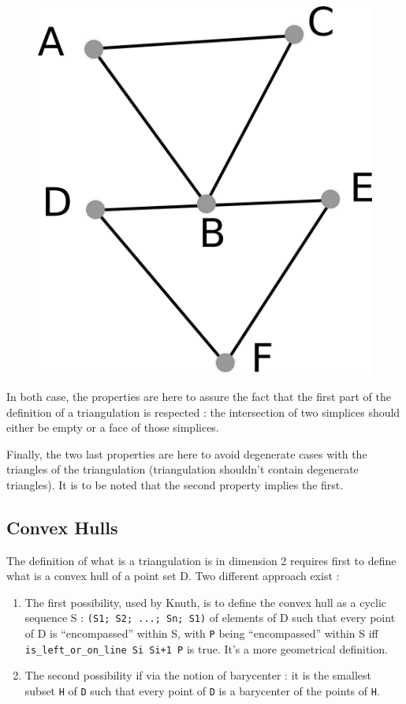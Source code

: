 \documentclass[a4paper,10pt]{article}
\begin{document}
\begin{enumerate}
\begin{figure}[h]
\includegraphics[scale=2]{nps}\\
\end{figure}
\end{enumerate}
In both case, the properties are here to assure the fact that the first part of the definition of a triangulation is respected : the intersection of two simplices should either be empty or a face of those simplices.

Finally, the two last properties are here to avoid degenerate cases with the triangles of the triangulation (triangulation shouldn't contain degenerate triangles). It is to be noted that the second property implies the first.

\subsection{Convex Hulls}

The definition of what is a triangulation is in dimension 2 requires first to define what is a convex hull of a point set D.
Two different approach exist :
\begin{enumerate}
\item The first possibility, used by Knuth,  is to define the convex hull as a cyclic sequence S : {\tt (S1; S2; ...; Sn; S1)} of elements of D such that every point of D is ``encompassed'' within S, with {\tt P} being ``encompassed'' within S iff {\tt is\_left\_or\_on\_line Si Si+1 P} is true.
  It's a more geometrical definition.
\item The second possibility if via the notion of barycenter : it is the smallest subset {\tt H} of {\tt D} such that every point of {\tt D} is a barycenter of the points of {\tt H}.
\end{enumerate}
\end{document}
